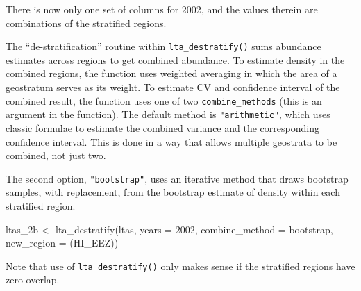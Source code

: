 \documentclass[
]{book}
\newenvironment{Shaded}{\begin{snugshade}}{\end{snugshade}}
\newcommand{\AttributeTok}[1]{\textcolor[rgb]{0.77,0.63,0.00}{#1}}
\newcommand{\ConstantTok}[1]{\textcolor[rgb]{0.00,0.00,0.00}{#1}}
\newcommand{\ControlFlowTok}[1]{\textcolor[rgb]{0.13,0.29,0.53}{\textbf{#1}}}
\newcommand{\DecValTok}[1]{\textcolor[rgb]{0.00,0.00,0.81}{#1}}
\newcommand{\FunctionTok}[1]{\textcolor[rgb]{0.00,0.00,0.00}{#1}}
\newcommand{\NormalTok}[1]{#1}
\newcommand{\OtherTok}[1]{\textcolor[rgb]{0.56,0.35,0.01}{#1}}
\newcommand{\SpecialCharTok}[1]{\textcolor[rgb]{0.00,0.00,0.00}{#1}}
\newcommand{\StringTok}[1]{\textcolor[rgb]{0.31,0.60,0.02}{#1}}
\begin{document}
There is now only one set of columns for 2002, and the values therein are combinations of the stratified regions.

The ``de-stratification'' routine within \texttt{lta\_destratify()} sums abundance estimates across regions to get combined abundance. To estimate density in the combined regions, the function uses weighted averaging in which the area of a geostratum serves as its weight. To estimate CV and confidence interval of the combined result, the function uses one of two \texttt{combine\_methods} (this is an argument in the function). The default method is \texttt{"arithmetic"}, which uses classic formulae to estimate the combined variance and the corresponding confidence interval. This is done in a way that allows multiple geostrata to be combined, not just two.

The second option, \texttt{"bootstrap"}, uses an iterative method that draws bootstrap samples, with replacement, from the bootstrap estimate of density within each stratified region.

\begin{Shaded}
\begin{Highlighting}[]
\NormalTok{ltas\_2b }\OtherTok{\textless{}{-}}
  \FunctionTok{lta\_destratify}\NormalTok{(ltas,}
               \AttributeTok{years =} \DecValTok{2002}\NormalTok{,}
               \AttributeTok{combine\_method =} \StringTok{\textquotesingle{}bootstrap\textquotesingle{}}\NormalTok{,}
               \AttributeTok{new\_region =} \StringTok{\textquotesingle{}(HI\_EEZ)\textquotesingle{}}\NormalTok{)}
\end{Highlighting}
\end{Shaded}

\begin{Shaded}
\end{Shaded}

Note that use of \texttt{lta\_destratify()} only makes sense if the stratified regions have zero overlap.
\end{document}
